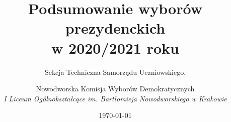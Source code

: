 \title{Podsumowanie wyborów prezydenckich\\ w 2020/2021 roku}
\date{\today}
\author{Sekcja Techniczna Samorządu Uczniowskiego, \and Nowodworska Komisja Wyborów Demokratycznych\\[0.5cm]
\emph{I Liceum Ogólnokształcące im. Bartłomieja Nowodworskiego w Krakowie}}

\maketitle

\hline
